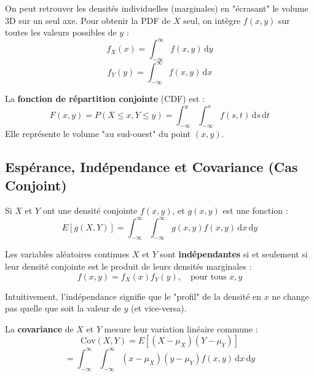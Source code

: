 \begin{definitionbox}
On peut retrouver les densités individuelles (marginales) en "écrasant" le volume 3D sur un seul axe. Pour obtenir la PDF de $X$ seul, on intègre $f(x,y)$ sur toutes les valeurs possibles de $y$ :
$$ f_X(x) = \int_{-\infty}^{\infty} f(x, y) \, \mathrm{d}y $$
$$ f_Y(y) = \int_{-\infty}^{\infty} f(x, y) \, \mathrm{d}x $$
\end{definitionbox}

\begin{definitionbox}
La \textbf{fonction de répartition conjointe} (CDF) est :
$$ F(x, y) = P(X \le x, Y \le y) = \int_{-\infty}^y \int_{-\infty}^x f(s, t) \, \mathrm{d}s \, \mathrm{d}t $$
Elle représente le volume "au sud-ouest" du point $(x, y)$.
\end{definitionbox}

\subsection{Espérance, Indépendance et Covariance (Cas Conjoint)}

\begin{theorembox}
Si $X$ et $Y$ ont une densité conjointe $f(x, y)$, et $g(x, y)$ est une fonction :
$$ E[g(X, Y)] = \int_{-\infty}^{\infty} \int_{-\infty}^{\infty} g(x, y) f(x, y) \, \mathrm{d}x \, \mathrm{d}y $$
\end{theorembox}

\begin{definitionbox}
Les variables aléatoires continues $X$ et $Y$ sont \textbf{indépendantes} si et seulement si leur densité conjointe est le produit de leurs densités marginales :
$$ f(x, y) = f_X(x) f_Y(y), \quad \text{pour tous } x, y $$
\end{definitionbox}

\begin{intuitionbox}
Intuitivement, l'indépendance signifie que le "profil" de la densité en $x$ ne change pas quelle que soit la valeur de $y$ (et vice-versa).
\end{intuitionbox}

\begin{definitionbox}
La \textbf{covariance} de $X$ et $Y$ mesure leur variation linéaire commune :
$$ \text{Cov}(X, Y) = E[(X - \mu_X)(Y - \mu_Y)] $$
$$ = \int_{-\infty}^{\infty} \int_{-\infty}^{\infty} (x - \mu_X)(y - \mu_Y) f(x, y) \, \mathrm{d}x \, \mathrm{d}y $$
\end{definitionbox}

